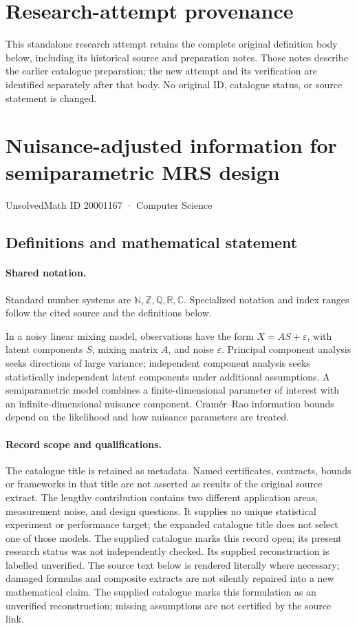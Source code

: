 \documentclass[11pt]{article}
\begin{document}
\section*{Research-attempt provenance}
This standalone research attempt retains the complete original definition body below,
including its historical source and preparation notes. Those notes describe the
earlier catalogue preparation; the new attempt and its verification are identified
separately after that body. No original ID, catalogue status, or source statement is changed.

\section{Nuisance-adjusted information for semiparametric MRS design}\label{20001167}
{\small UnsolvedMath ID 20001167 · Computer Science}
\subsection{Definitions and mathematical statement}

\paragraph{Shared notation.}Standard number systems are $\mathbb N,\mathbb Z,\mathbb Q,\mathbb R,\mathbb C$. Specialized notation and index ranges follow the cited source and the definitions below.


In a noisy linear mixing model, observations have the form $X=AS+\varepsilon$, with latent components $S$, mixing matrix $A$, and noise $\varepsilon$. Principal component analysis seeks directions of large variance; independent component analysis seeks statistically independent latent components under additional assumptions. A semiparametric model combines a finite-dimensional parameter of interest with an infinite-dimensional nuisance component. Cramér--Rao information bounds depend on the likelihood and how nuisance parameters are treated.
\paragraph{Record scope and qualifications.}
The catalogue title is retained as metadata. Named certificates, contracts, bounds or frameworks in that title are not asserted as results of the original source extract.
The lengthy contribution contains two different application areas, measurement noise, and design questions. It supplies no unique statistical experiment or performance target; the expanded catalogue title does not select one of those models. The supplied catalogue marks this record open; its present research status was not independently checked. Its supplied reconstruction is labelled unverified.
The source text below is rendered literally where necessary; damaged formulas and composite extracts are not silently repaired into a new mathematical claim.
The supplied catalogue marks this formulation as an unverified reconstruction; missing assumptions are not certified by the source link.
\end{document}

